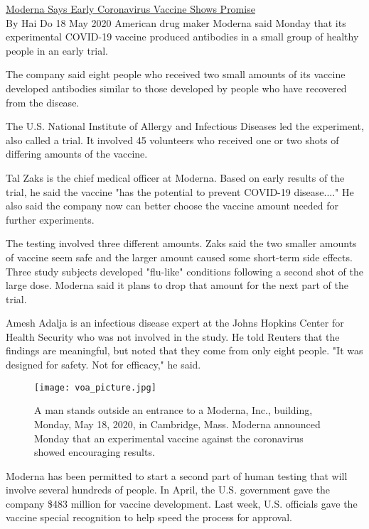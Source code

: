 \href{https://www.51voa.com/VOA_Special_English/moderna-says-early-coronavirus-vaccine-shows-promise-84567.html}{Moderna Says Early Coronavirus Vaccine Shows Promise} \\
 
By Hai Do
18 May 2020
American drug maker Moderna said Monday that its experimental COVID-19 vaccine produced antibodies in a small group of healthy people in an early trial.

The company said eight people who received two small amounts of its vaccine developed antibodies similar to those developed by people who have recovered from the disease.

The U.S. National Institute of Allergy and Infectious Diseases led the experiment, also called a trial. It involved 45 volunteers who received one or two shots of differing amounts of the vaccine.

Tal Zaks is the chief medical officer at Moderna. Based on early results of the trial, he said the vaccine "has the potential to prevent COVID-19 disease...." He also said the company now can better choose the vaccine amount needed for further experiments.

The testing involved three different amounts. Zaks said the two smaller amounts of vaccine seem safe and the larger amount caused some short-term side effects. Three study subjects developed "flu-like" conditions following a second shot of the large dose. Moderna said it plans to drop that amount for the next part of the trial.

Amesh Adalja is an infectious disease expert at the Johns Hopkins Center for Health Security who was not involved in the study. He told Reuters that the findings are meaningful, but noted that they come from only eight people. "It was designed for safety. Not for efficacy," he said.

\begin{figure}[h] %
    \centering
    \texttt{[image: voa\_picture.jpg]}
    \caption{A man stands outside an entrance to a Moderna, Inc., building, Monday, May 18, 2020, in Cambridge, Mass. Moderna announced Monday that an experimental vaccine against the coronavirus showed encouraging results.}
\end{figure}

Moderna has been permitted to start a second part of human testing that will involve several hundreds of people. In April, the U.S. government gave the company \$483 million for vaccine development. Last week, U.S. officials gave the vaccine special recognition to help speed the process for approval.

